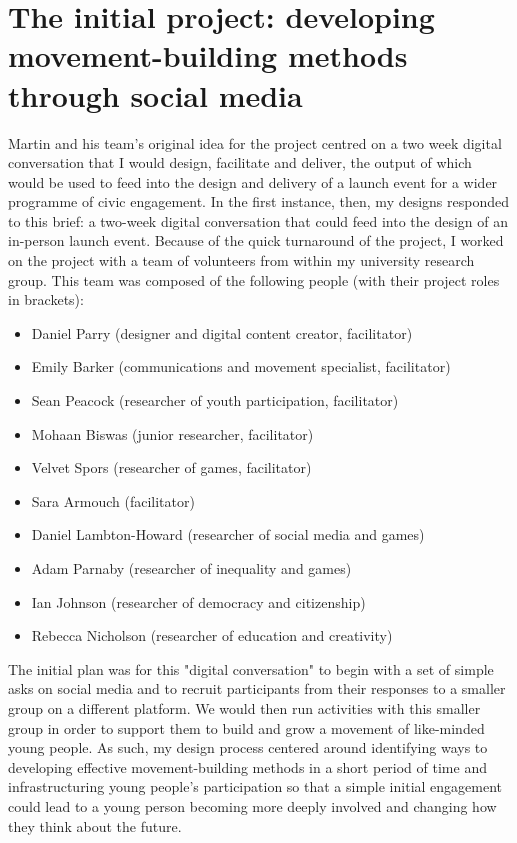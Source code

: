 \section{The initial project: developing movement-building methods through social media}
Martin and his team's original idea for the project centred on a two week digital conversation that I would design, facilitate and deliver, the output of which would be used to feed into the design and delivery of a launch event for a wider programme of civic engagement.  In the first instance, then, my designs responded to this brief: a two-week digital conversation that could feed into the design of an in-person launch event. Because of the quick turnaround of the project, I worked on the project with a team of volunteers from within my university research group. This team was composed of the following people (with their project roles in brackets):
\begin{itemize}
    \item Daniel Parry (designer and digital content creator, facilitator)
    \item Emily Barker (communications and movement specialist, facilitator)
    \item Sean Peacock (researcher of youth participation, facilitator)
    \item Mohaan Biswas (junior researcher, facilitator)
    \item Velvet Spors (researcher of games, facilitator)
    \item Sara Armouch (facilitator)
    \item Daniel Lambton-Howard (researcher of social media and games)
    \item Adam Parnaby (researcher of inequality and games)
    \item Ian Johnson (researcher of democracy and citizenship)
    \item Rebecca Nicholson (researcher of education and creativity)
\end{itemize}
The initial plan was for this "digital conversation" to begin with a set of simple asks on social media and to recruit participants from their responses to a smaller group on a different platform. We would then run activities with this smaller group in order to support them to build and grow a movement of like-minded young people. As such, my design process centered around identifying ways to developing effective movement-building methods in a short period of time and infrastructuring young people's participation so that a simple initial engagement could lead to a young person becoming more deeply involved and changing how they think about the future.

